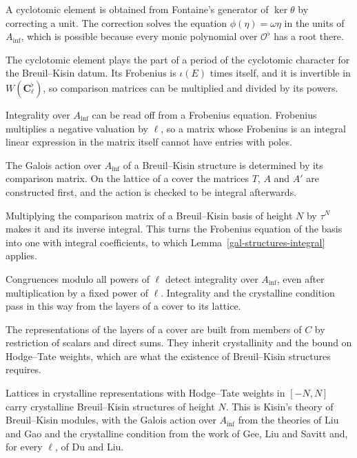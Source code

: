 A cyclotomic element is obtained from Fontaine's generator of $\ker\theta$ by correcting a unit. The
correction solves the equation $\phi(\eta)=\omega\eta$ in the units of $A_{\inf}$, which is possible because
every monic polynomial over $\mathcal O^\flat$ has a root there.

The cyclotomic element plays the part of a period of the cyclotomic character for the Breuil--Kisin datum.
Its Frobenius is $\iota(E)$ times itself, and it is invertible in $W(\mathbf C_\ell^\flat)$, so comparison
matrices can be multiplied and divided by its powers.

Integrality over $A_{\inf}$ can be read off from a Frobenius equation. Frobenius multiplies a negative
valuation by $\ell$, so a matrix whose Frobenius is an integral linear expression in the matrix itself
cannot have entries with poles.

The Galois action over $A_{\inf}$ of a Breuil--Kisin structure is determined by its comparison matrix. On
the lattice of a cover the matrices $T$, $A$ and $A'$ are constructed first, and the action is checked to
be integral afterwards.

Multiplying the comparison matrix of a Breuil--Kisin basis of height $N$ by $\tau^N$ makes it and its
inverse integral. This turns the Frobenius equation of the basis into one with integral coefficients, to
which Lemma~\ref{gal-structures-integral} applies.

Congruences modulo all powers of $\ell$ detect integrality over $A_{\inf}$, even after multiplication by a
fixed power of $\ell$. Integrality and the crystalline condition pass in this way from the layers of a
cover to its lattice.

The representations of the layers of a cover are built from members of $C$ by restriction of scalars and
direct sums. They inherit crystallinity and the bound on Hodge--Tate weights, which are what the
existence of Breuil--Kisin structures requires.

Lattices in crystalline representations with Hodge--Tate weights in $[-N,N]$ carry crystalline
Breuil--Kisin structures of height $N$. This is Kisin's theory of Breuil--Kisin modules, with the Galois
action over $A_{\inf}$ from the theories of Liu and Gao and the crystalline condition from the work of Gee, Liu
and Savitt and, for every $\ell$, of Du and Liu.

